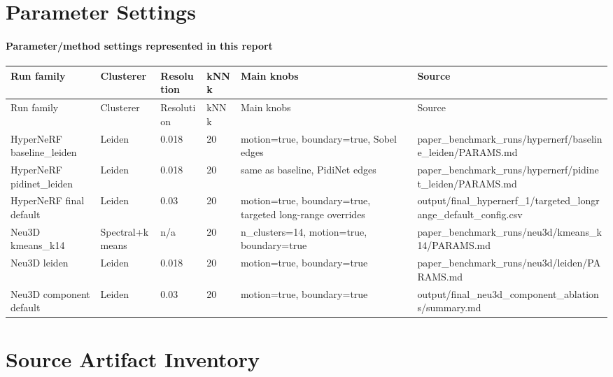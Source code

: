 \documentclass[10pt]{article}
\begin{document}
\section{Parameter Settings}
\paragraph{Parameter/method settings represented in this report}
\small
\begin{longtable}{llllp{5cm}p{5cm}}
\toprule
Run family & Clusterer & Resolution & kNN k & Main knobs & Source \\
\midrule
\endfirsthead
\toprule
Run family & Clusterer & Resolution & kNN k & Main knobs & Source \\
\midrule
\endhead
HyperNeRF baseline\_leiden & Leiden & 0.018 & 20 & motion=true, boundary=true, Sobel edges & paper\_benchmark\_runs/hypernerf/baseline\_leiden/PARAMS.md \\
HyperNeRF pidinet\_leiden & Leiden & 0.018 & 20 & same as baseline, PidiNet edges & paper\_benchmark\_runs/hypernerf/pidinet\_leiden/PARAMS.md \\
HyperNeRF final default & Leiden & 0.03 & 20 & motion=true, boundary=true, targeted long-range overrides & output/final\_hypernerf\_1/targeted\_longrange\_default\_config.csv \\
Neu3D kmeans\_k14 & Spectral+kmeans & n/a & 20 & n\_clusters=14, motion=true, boundary=true & paper\_benchmark\_runs/neu3d/kmeans\_k14/PARAMS.md \\
Neu3D leiden & Leiden & 0.018 & 20 & motion=true, boundary=true & paper\_benchmark\_runs/neu3d/leiden/PARAMS.md \\
Neu3D component default & Leiden & 0.03 & 20 & motion=true, boundary=true & output/final\_neu3d\_component\_ablations/summary.md \\
\bottomrule
\end{longtable}
\normalsize

\section{Source Artifact Inventory}
\end{document}
